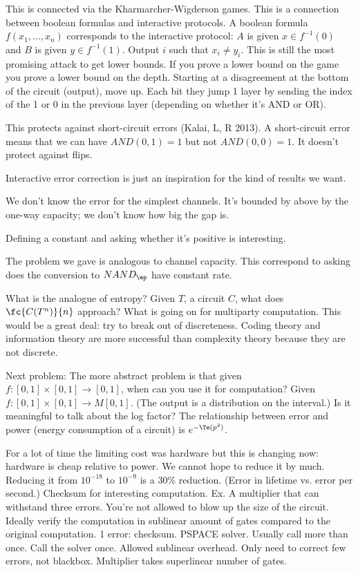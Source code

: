This is connected via the Kharmarcher-Wigderson games. This is a connection between boolean formulas and interactive protocols.
A boolean formula $f(x_1,\ldots ,x_n)$ corresponds to the interactive protocol: $A$ is given $x\in f^{-1}(0)$ and $B$ is given $y\in f^{-1}(1)$. Output $i$ such that $x_i\ne y_i$. 
This is still the most promising attack to get lower bounds.
If you prove a lower bound on the game you prove a lower bound on the depth.
Starting at a disagreement at the bottom of the circuit (output), move up. Each bit they jump 1 layer by sending the index of the 1 or 0 in the previous layer (depending on whether it's AND or OR). 

This protects against short-circuit errors (Kalai, L, R 2013). A short-circuit error means that we can have $AND(0,1)=1$ but not $AND(0,0)=1$. It doesn't protect against flips.

Interactive error correction is just an inspiration for the kind of results we want.

We don't know the error for the simplest channels. It's bounded by above by the one-way capacity; we don't know how big the gap is.

Defining a constant and asking whether it's positive is interesting. 

The problem we gave is analogous to channel capacity. This correspond to asking does the conversion to $NAND_\ep$ have constant rate. %

What is the analogue of entropy? Given $T$, a circuit $C$, what does $\fc{C(T^n)}{n}$ approach? What is going on for multiparty computation. This would be a great deal: try to break out of discreteness. Coding theory and information theory are more successful than complexity theory because they are not discrete.


Next problem: 
The more abstract problem is that given $f:[0,1]\times [0,1]\to [0,1]$, when can you use it for computation?
Given $f:[0,1]\times [0,1]\to M[0,1]$. (The output is a distribution on the interval.)
Is it meaningful to talk about the log factor?
The relationship between error and power (energy consumption of a circuit) is $e^{-\Te(p^2)}$.

For a lot of time the limiting cost was hardware but this is changing now: hardware is cheap relative to power.
We cannot hope to reduce it by much. Reducing it from $10^{-18}$ to $10^{-9}$ is a $30\%$ reduction. (Error in lifetime vs. error per second.)
Checksum for interesting computation.
Ex. A multiplier that can withstand three errors. You're not allowed to blow up the size of the circuit. Ideally verify the computation in sublinear amount of gates compared to the original computation. 
1 error: checksum.
PSPACE solver. Usually call more than once. Call the solver once. Allowed sublinear overhead. Only need to correct few errors, not blackbox. Multiplier takes superlinear number of gates.

